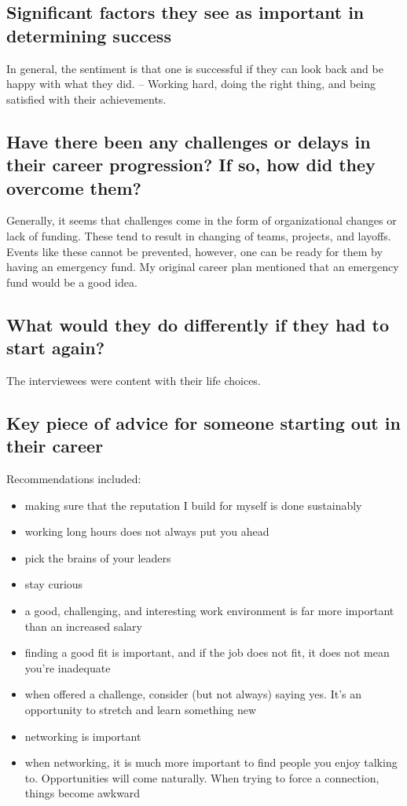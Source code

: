 \subsection{Significant factors they see as important in determining success}
In general, the sentiment is that one is successful if they can look back and be happy with what they did. -- Working hard, doing the right thing, and being satisfied with their achievements.

\subsection{Have there been any challenges or delays in their career progression? If so, how did they overcome them?}
Generally, it seems that challenges come in the form of organizational changes
or lack of funding. These tend to result in changing of teams, projects, and
layoffs. Events like these cannot be prevented, however, one can be ready for
them by having an emergency fund. My original career plan mentioned that an
emergency fund would be a good idea.

\subsection{What would they do differently if they had to start again?}
The interviewees were content with their life choices.

\subsection{Key piece of advice for someone starting out in their career}
Recommendations included:
\begin{singlespace}
  \begin{itemize}
      \item making sure that the reputation I build for myself is done sustainably
      \item working long hours does not always put you ahead
      \item pick the brains of your leaders 
      \item stay curious
      \item a good, challenging, and interesting work environment is far more important than an increased salary
      \item finding a good fit is important, and if the job does not fit, it does not mean you're inadequate
      \item when offered a challenge, consider (but not always) saying yes. It's an opportunity to stretch and learn something new
      \item networking is important
      \item when networking, it is much more important to find people you enjoy talking to.
            Opportunities will come naturally. When trying to force a connection, things become awkward
  \end{itemize}
\end{singlespace}

